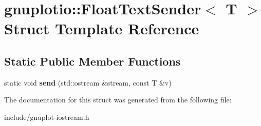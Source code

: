 \hypertarget{structgnuplotio_1_1FloatTextSender}{}\section{gnuplotio\+:\+:Float\+Text\+Sender$<$ T $>$ Struct Template Reference}
\label{structgnuplotio_1_1FloatTextSender}
\subsection*{Static Public Member Functions}
\begin{DoxyCompactItemize}
\item 
\mbox{\label{structgnuplotio_1_1FloatTextSender_aed6b6c3a95b1396688800d6d1f2fc299}} 
static void {\bfseries send} (std\+::ostream \&stream, const T \&v)
\end{DoxyCompactItemize}


The documentation for this struct was generated from the following file\+:\begin{DoxyCompactItemize}
\item 
include/gnuplot-\/iostream.\+h\end{DoxyCompactItemize}
